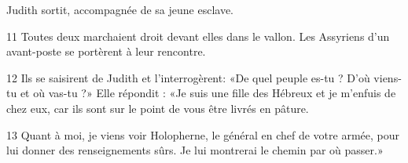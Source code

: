 Judith sortit, accompagnée de sa jeune esclave.

11 Toutes deux marchaient droit devant elles dans le vallon. Les Assyriens d'un avant-poste se portèrent à leur rencontre.

12 Ils se saisirent de Judith et l'interrogèrent: «De quel peuple es-tu ? D'où viens-tu et où vas-tu ?» Elle répondit : «Je suis une fille des Hébreux et je m'enfuis de chez eux, car ils sont sur le point de vous être livrés en pâture.

13 Quant à moi, je viens voir Holopherne, le général en chef de votre armée, pour lui donner des renseignements sûrs. Je lui montrerai le chemin par où passer.»





